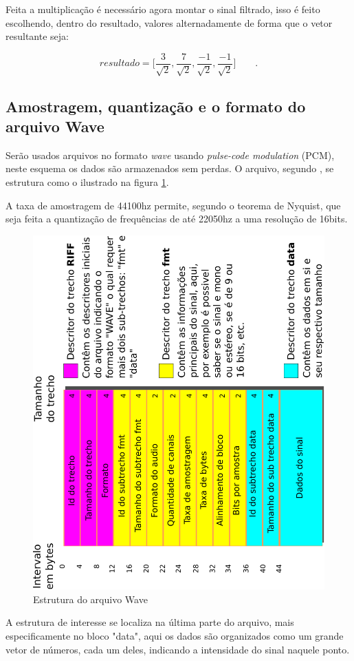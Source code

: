 \documentclass[a4paper,12pt,openright,oneside]{book}
\newenvironment{myenv}[1]
  {\begin{spacing}{#1}}
  {\end{spacing}}
\begin{document}
\begin{myenv}{1.5}
				\par Feita a multiplicação é necessário agora montar o sinal filtrado, isso é feito escolhendo, dentro do resultado, valores alternadamente de forma que o vetor resultante seja:

				\begin{equation}
					resultado = \Big[
					\frac{3}{\sqrt{2}},
					\frac{7}{\sqrt{2}},
					\frac{-1}{\sqrt{2}},
					\frac{-1}{\sqrt{2}}
					\Big]\qquad.
				\end{equation}
			
				\subsection{Amostragem, quantização e o formato do arquivo Wave}
					\par Serão usados arquivos no formato \textit{wave} usando \textit{pulse-code modulation} (PCM), neste esquema os dados são armazenados sem perdas. O arquivo, segundo \cite{WAVE2019}, se estrutura como o ilustrado na figura \ref{fig:wavePcmStructure}.
					
					\par A taxa de amostragem de 44100hz permite, segundo o teorema de Nyquist, que seja feita a quantização de frequências de até 22050hz a uma resolução de 16bits.
				
					\begin{figure}[h]
						\centering
						\includegraphics[width=0.45\linewidth, angle=-90]{images/wavePcmStructure.pdf}
						\caption{Estrutura do arquivo Wave}
						\label{fig:wavePcmStructure}
					\end{figure}
					
					\par A estrutura de interesse se localiza na última parte do arquivo, mais especificamente no bloco "data", aqui os dados são organizados como um grande vetor de números, cada um deles, indicando a intensidade do sinal naquele ponto.

\end{myenv}
\end{document}
